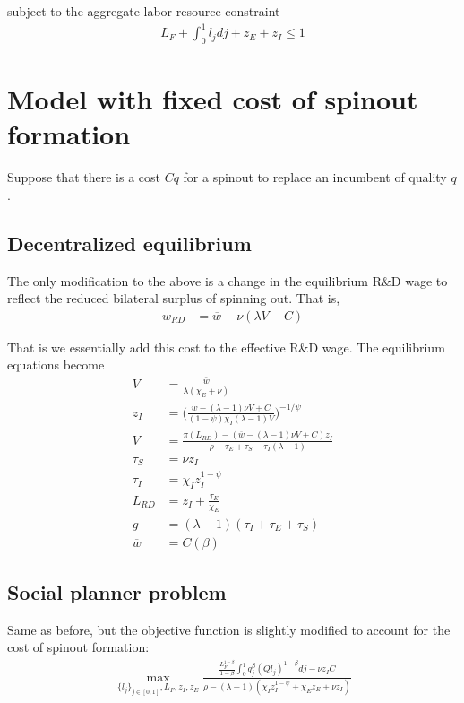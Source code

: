 \documentclass[12pt,english]{article}
\theoremstyle{remark}
\begin{document}
subject to the aggregate labor resource constraint
\begin{align*}
	L_F + \int_0^1 l_j dj + z_E + z_I \le 1
\end{align*}


\section{Model with fixed cost of spinout formation}

Suppose that there is a cost $Cq$ for a spinout to replace an incumbent of quality $q$. 

\subsection{Decentralized equilibrium}


The only modification to the above is a change in the equilibrium R\&D wage to reflect the reduced bilateral surplus of spinning out. That is,
\begin{align*}
	w_{RD} &= \overline{w} - \nu (\lambda V - C)
\end{align*}

That is we essentially add this cost to the effective R\&D wage. The equilibrium equations become
\begin{align*}
V &= \frac{\bar{w}}{\lambda(\chi_E + \nu)} \\
z_I &= \Big(  \frac{\bar{w}-(\lambda-1)\nu V + C}{(1-\psi)\chi_I(\lambda-1)V} \Big)^{-1/\psi} \\
V &= \frac{\pi(L_{RD}) - (\overline{w} - (\lambda-1)\nu V + C) z_I}{\rho + \tau_E + \tau_S - \tau_I (\lambda -1)} \\
\tau_S &= \nu z_I \\
\tau_I &= \chi_I z_I^{1-\psi} \\
L_{RD} &= z_I + \frac{\tau_E}{\chi_E} \\
g &= (\lambda - 1)(\tau_I + \tau_E+ \tau_S)  \\
\overline{w} &= C(\beta)
\end{align*}

\subsection{Social planner problem}

Same as before, but the objective function is slightly modified to account for the cost of spinout formation:
\begin{align*}
\max_{\{l_j\}_{j\in[0,1]},L_F,z_I,z_E} \frac{\frac{L_F^{1-\beta}}{1-\beta} \int_0^1 q_j^{\beta} (Q l_j)^{1-\beta} dj - \nu z_I C}{\rho - (\lambda-1)(\chi_I z_I^{1-\psi} + \chi_E z_E + \nu z_I)} 
\end{align*}
\end{document}
